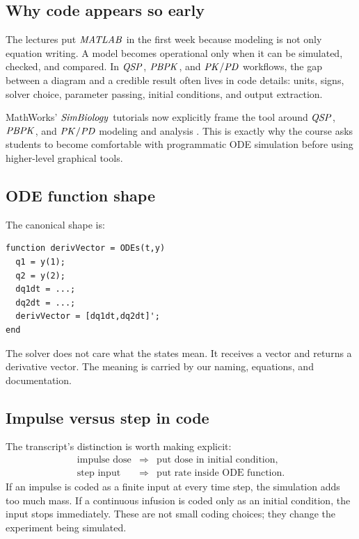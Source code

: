 \documentclass[a4paper]{article}
\newcommand{\PKPD}{\ensuremath{\pksym{PK}/\pksym{PD}}}
\newcommand{\QSP}{\ensuremath{\pksym{QSP}}}
\newcommand{\PBPK}{\ensuremath{\pksym{PBPK}}}
\newcommand{\MATLAB}{\ensuremath{\pksym{MATLAB}}}
\newcommand{\SimBio}{\ensuremath{\pksym{SimBiology}}}
\begin{document}
\subsection{Why code appears so early}

The lectures put \MATLAB{} in the first week because modeling is not only equation writing. A model becomes operational only when it can be simulated, checked, and compared. In \QSP{}, \PBPK{}, and \PKPD{} workflows, the gap between a diagram and a credible result often lives in code details: units, signs, solver choice, parameter passing, initial conditions, and output extraction.

MathWorks' \SimBio{} tutorials now explicitly frame the tool around \QSP{}, \PBPK{}, and \PKPD{} modeling and analysis \cite{mathworksSimBiologyTutorials2026}. This is exactly why the course asks students to become comfortable with programmatic ODE simulation before using higher-level graphical tools.

\subsection{ODE function shape}

The canonical shape is:
\begin{verbatim}
function derivVector = ODEs(t,y)
  q1 = y(1);
  q2 = y(2);
  dq1dt = ...;
  dq2dt = ...;
  derivVector = [dq1dt,dq2dt]';
end
\end{verbatim}
The solver does not care what the states mean. It receives a vector and returns a derivative vector. The meaning is carried by our naming, equations, and documentation.

\subsection{Impulse versus step in code}

The transcript's distinction is worth making explicit:
\[
  \begin{array}{lll}
  \text{impulse dose} & \Rightarrow & \text{put dose in initial condition},\\
  \text{step input} & \Rightarrow & \text{put rate inside ODE function}.
  \end{array}
\]
If an impulse is coded as a finite input at every time step, the simulation adds too much mass. If a continuous infusion is coded only as an initial condition, the input stops immediately. These are not small coding choices; they change the experiment being simulated.
\end{document}
